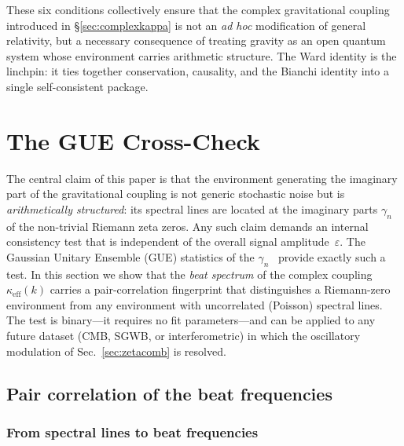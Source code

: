\documentclass[12pt,a4paper]{article}
\begin{document}
\noindent
These six conditions collectively ensure that the complex gravitational
coupling introduced in \S\ref{sec:complexkappa} is not an \emph{ad hoc}
modification of general relativity, but a necessary consequence of
treating gravity as an open quantum system whose environment carries
arithmetic structure.  The Ward identity is the linchpin: it ties
together conservation, causality, and the Bianchi identity into a single
self-consistent package.



\section{The GUE Cross-Check}\label{sec:gue}

The central claim of this paper is that the environment
generating the imaginary part of the gravitational coupling
is not generic stochastic noise but is \emph{arithmetically structured}:
its spectral lines are located at the imaginary parts
$\gamma_n$ of the non-trivial Riemann zeta zeros.
Any such claim demands an internal consistency test that is
independent of the overall signal amplitude~$\varepsilon$.
The Gaussian Unitary Ensemble (GUE) statistics of the
$\gamma_n$~\cite{Montgomery1973,Odlyzko1987}
provide exactly such a test.
In this section we show that the \emph{beat spectrum}
of the complex coupling $\kappa_{\mathrm{eff}}(k)$ carries
a pair-correlation fingerprint that distinguishes a
Riemann-zero environment from any environment with
uncorrelated (Poisson) spectral lines.
The test is binary---it requires no fit parameters---and
can be applied to any future dataset (CMB, SGWB, or
interferometric) in which the oscillatory modulation of
Sec.~\ref{sec:zetacomb} is resolved.


\subsection{Pair correlation of the beat frequencies}
\label{sec:paircorr}

\subsubsection{From spectral lines to beat frequencies}
\end{document}
